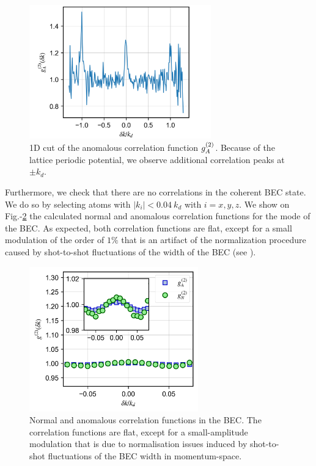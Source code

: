 \begin{figure}
    \centering
    \includegraphics[width=0.7\textwidth]{Fig/Chapter4/periodicity.png}
    \caption[1D cut of the anomalous correlation function $\gtwo_A$ illustrating its periodicity]{1D cut of the anomalous correlation function $\gtwo_A$. Because of the lattice periodic potential, we observe additional correlation peaks at $\pm k_d$.}
    \label{fig:periodicity}
\end{figure}

Furthermore, we check that there are no correlations in the coherent BEC state. We do so by selecting atoms with $|k_i|<0.04 \ k_d$ with $i=x,y,z$. We show on Fig.-\ref{fig:BEC_correlations} the calculated normal and anomalous correlation functions for the mode of the BEC. As expected, both correlation functions are flat, except for a small modulation of the order of $1 \%$ that is an artifact of the normalization procedure caused by shot-to-shot fluctuations of the width of the BEC (see \cite{cayla_these}).

\begin{figure}
    \centering
    \includegraphics[width=0.65\textwidth]{Fig/Chapter4/correlations_BEC.png}
    \caption[Normal and anomalous correlation functions in the BEC]{Normal and anomalous correlation functions in the BEC. The correlation functions are flat, except for a small-amplitude modulation that is due to normalisation issues induced by shot-to-shot fluctuations of the BEC width in momentum-space.}
    \label{fig:BEC_correlations}
\end{figure}

